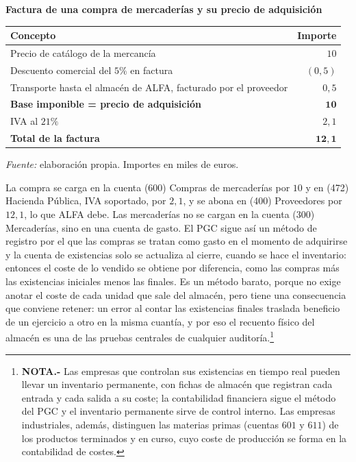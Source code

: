 \documentclass[10pt,a4paper]{article}
\begin{document}
\begin{center}\begin{minipage}{\linewidth}\centering
{\small\textbf{Factura de una compra de mercaderías y su precio de adquisición}}\par\vspace{0.3em}
{\small
\begin{tabular}{p{9cm} r}
\hline
\textbf{Concepto} & \textbf{Importe} \\
\hline
Precio de catálogo de la mercancía & $10$ \\
Descuento comercial del $5\%$ en factura & $(0,5)$ \\
Transporte hasta el almacén de ALFA, facturado por el proveedor & $0,5$ \\
\textbf{Base imponible = precio de adquisición} & $\mathbf{10}$ \\
IVA al $21\%$ & $2,1$ \\
\textbf{Total de la factura} & $\mathbf{12,1}$ \\
\hline
\end{tabular}}\par\vspace{0.3em}
{\small\textit{Fuente: }elaboración propia. Importes en miles de euros.}
\end{minipage}\end{center}

La compra se carga en la cuenta (600) Compras de mercaderías por $10$ y en (472) Hacienda Pública, IVA soportado, por $2,1$, y se abona en (400) Proveedores por $12,1$, lo que ALFA debe. Las mercaderías no se cargan en la cuenta (300) Mercaderías, sino en una cuenta de gasto. El PGC sigue así un método de registro por el que las compras se tratan como gasto en el momento de adquirirse y la cuenta de existencias solo se actualiza al cierre, cuando se hace el inventario: entonces el coste de lo vendido se obtiene por diferencia, como las compras más las existencias iniciales menos las finales. Es un método barato, porque no exige anotar el coste de cada unidad que sale del almacén, pero tiene una consecuencia que conviene retener: un error al contar las existencias finales traslada beneficio de un ejercicio a otro en la misma cuantía, y por eso el recuento físico del almacén es una de las pruebas centrales de cualquier auditoría.\footnote{%
    \textbf{NOTA.-} Las empresas que controlan sus existencias en tiempo real pueden llevar un inventario permanente, con fichas de almacén que registran cada entrada y cada salida a su coste; la contabilidad financiera sigue el método del PGC y el inventario permanente sirve de control interno. Las empresas industriales, además, distinguen las materias primas (cuentas $601$ y $611$) de los productos terminados y en curso, cuyo coste de producción se forma en la contabilidad de costes.
}
\end{document}
